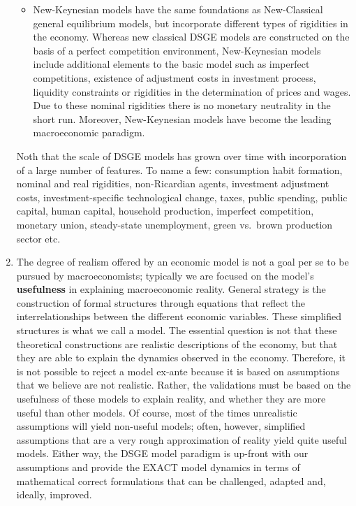\begin{enumerate}
\begin{itemize}
\item New-Keynesian models have the same foundations as New-Classical general equilibrium models,
  but incorporate different types of rigidities in the economy.
Whereas new classical DSGE models are constructed on the basis of a perfect competition environment,
New-Keynesian models include additional elements to the basic model such as imperfect competitions,
  existence of adjustment costs in investment process,
  liquidity constraints or rigidities in the determination of prices and wages.
Due to these nominal rigidities there is no monetary neutrality in the short run.
Moreover, New-Keynesian models have become the leading macroeconomic paradigm.

\end{itemize}
Noth that the scale of DSGE models has grown over time with incorporation of a large number of features.
To name a few: consumption habit formation, nominal and real rigidities, non-Ricardian agents,
investment adjustment costs, investment-specific technological change, taxes, public spending, public capital, human capital,
household production, imperfect competition, monetary union, steady-state unemployment, green vs.\ brown production sector etc.

\item The degree of realism offered by an economic model is not a goal per se to be pursued by macroeconomists;
  typically we are focused on the model's \textbf{usefulness} in explaining macroeconomic reality.
General strategy is the construction of formal structures through equations that reflect the interrelationships between the different economic variables.
These simplified structures is what we call a model.
The essential question is not that these theoretical constructions are realistic descriptions of the economy,
  but that they are able to explain the dynamics observed in the economy.
Therefore, it is not possible to reject a model ex-ante because it is based on assumptions that we believe are not realistic.
Rather, the validations must be based on the usefulness of these models to explain reality, and whether they are more useful than other models.
Of course, most of the times unrealistic assumptions will yield non-useful models;
  often, however, simplified assumptions that are a very rough approximation of reality yield quite useful models.
Either way, the DSGE model paradigm is up-front with our assumptions
  and provide the EXACT model dynamics in terms of mathematical correct formulations that can be challenged, adapted and, ideally, improved.


\end{enumerate}
